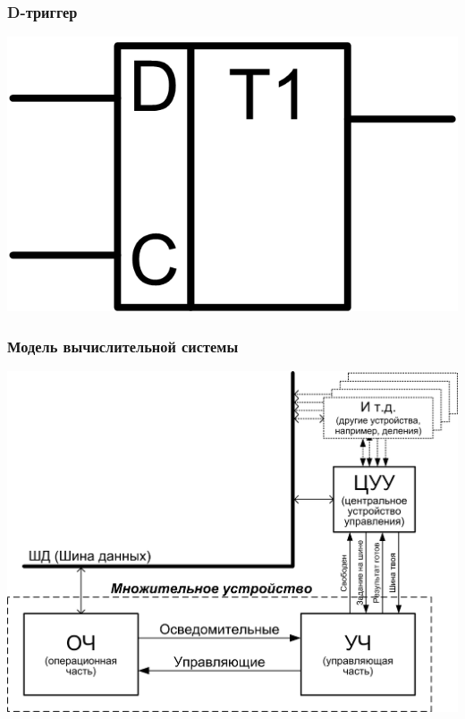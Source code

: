 \begin{frame}
    \frametitle{D-триггер}
    \begin{center}
        \includegraphics{fig/dtrigger}
    \end{center}
\end{frame}

\begin{frame}
    \frametitle{Модель вычислительной системы}
    \begin{center}
        \includegraphics[height=.85\textheight]{fig/model}
    \end{center}
\end{frame}
    
